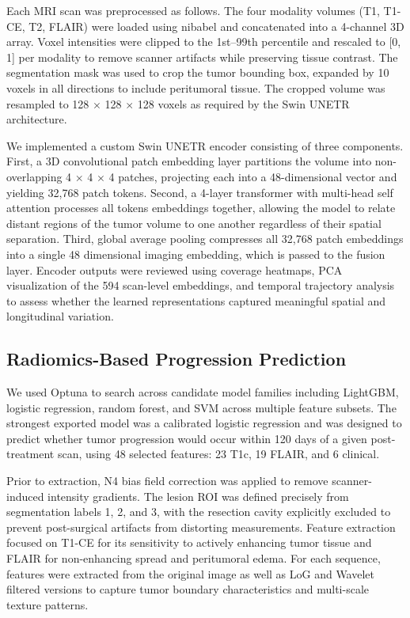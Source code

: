 \documentclass[letterpaper, 10pt, conference]{IEEEtran}
\begin{document}
Each MRI scan was preprocessed as follows. The four modality volumes (T1, T1-CE, T2, FLAIR) were loaded using nibabel
and concatenated into a 4-channel 3D array. Voxel intensities were clipped to the 1st--99th percentile and rescaled to
[0, 1] per modality to remove scanner artifacts while preserving tissue contrast. The segmentation mask was used to
crop the tumor bounding box, expanded by 10 voxels in all directions to include peritumoral tissue. The cropped volume
was resampled to 128 $\times$ 128 $\times$ 128 voxels as required by the Swin UNETR architecture.

We implemented a custom Swin UNETR encoder consisting of three components. First, a 3D convolutional patch embedding
layer partitions the volume into non-overlapping 4 $\times$ 4 $\times$ 4 patches, projecting each into a
48-dimensional vector and yielding 32,768 patch tokens. Second, a 4-layer transformer with multi-head self attention
processes all tokens embeddings together, allowing the model to relate distant regions of the tumor volume to one
another regardless of their spatial separation. Third, global average pooling compresses all 32,768 patch embeddings
into a single 48 dimensional imaging embedding, which is passed to the fusion layer. Encoder outputs were reviewed
using coverage heatmaps, PCA visualization of the 594 scan-level embeddings, and temporal trajectory analysis to
assess whether the learned representations captured meaningful spatial and longitudinal variation.

\subsection{Radiomics-Based Progression Prediction}
We used Optuna to search across candidate model families including LightGBM, logistic regression, random forest, and
SVM across multiple feature subsets. The strongest exported model was a calibrated logistic regression and was
designed to predict whether tumor progression would occur within 120 days of a given post-treatment scan, using 48
selected features: 23 T1c, 19 FLAIR, and 6 clinical.

Prior to extraction, N4 bias field correction was applied to remove scanner-induced intensity gradients. The lesion
ROI was defined precisely from segmentation labels 1, 2, and 3, with the resection cavity explicitly excluded to
prevent post-surgical artifacts from distorting measurements. Feature extraction focused on T1-CE for its sensitivity
to actively enhancing tumor tissue and FLAIR for non-enhancing spread and peritumoral edema. For each sequence,
features were extracted from the original image as well as LoG and Wavelet filtered versions to capture tumor
boundary characteristics and multi-scale texture patterns.
\end{document}
